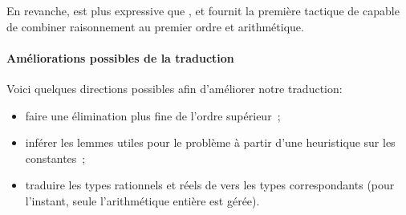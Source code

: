 En revanche, \beagletac est plus expressive que \metistac, et fournit la
première tactique de \holfour capable de combiner raisonnement au premier
ordre et arithmétique.


\paragraph {Améliorations possibles de la traduction}

Voici quelques directions possibles afin d'améliorer notre traduction:
\begin{itemize}
\item faire une élimination plus fine de l'ordre supérieur~\cite{Bohme12};
\item inférer les lemmes utiles pour le problème à partir d'une
  heuristique sur les constantes~\cite{Paulson10};
\item traduire les types rationnels et réels de \holfour vers les types
  \tff correspondants (pour l'instant, seule l'arithmétique entière est
  gérée).
\end{itemize}



